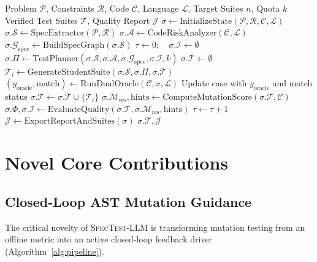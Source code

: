 \documentclass[conference]{IEEEtran}
\begin{document}
\begin{algorithm}[t]
\caption{Closed-Loop Mutation-Guided Test Generation}
\label{alg:pipeline}
\begin{algorithmic}[1]
\REQUIRE Problem $\mathcal{P}$, Constraints $\mathcal{R}$, Code $\mathcal{C}$, Language $\mathcal{L}$, Target Suites $n$, Quota $k$
\ENSURE Verified Test Suites $\mathcal{T}$, Quality Report $\mathcal{J}$
\STATE $\sigma \leftarrow \text{InitializeState}(\mathcal{P}, \mathcal{R}, \mathcal{C}, \mathcal{L})$
\STATE $\sigma.\mathcal{S} \leftarrow \text{SpecExtractor}(\mathcal{P}, \mathcal{R})$
\STATE $\sigma.\mathcal{A} \leftarrow \text{CodeRiskAnalyzer}(\mathcal{C}, \mathcal{L})$
\STATE $\sigma.\mathcal{G}_{\text{spec}} \leftarrow \text{BuildSpecGraph}(\sigma.\mathcal{S})$
\STATE $\tau \leftarrow 0; \quad \sigma.\mathcal{I} \leftarrow \emptyset$
\REPEAT
    \STATE $\sigma.\Pi \leftarrow \text{TestPlanner}(\sigma.\mathcal{S}, \sigma.\mathcal{A}, \sigma.\mathcal{G}_{\text{spec}}, \sigma.\mathcal{I}, k)$
    \STATE $\sigma.\mathcal{T} \leftarrow \emptyset$
        \STATE $\mathcal{T}_i \leftarrow \text{GenerateStudentSuite}(\sigma.\mathcal{S}, \sigma.\Pi, \sigma.\mathcal{T})$
            \STATE $(y_{\text{oracle}}, \text{match}) \leftarrow \text{RunDualOracle}(\mathcal{C}, x, \mathcal{L})$
            \STATE Update case with $y_{\text{oracle}}$ and match status
        \ENDFOR
        \STATE $\sigma.\mathcal{T} \leftarrow \sigma.\mathcal{T} \cup \{\mathcal{T}_i\}$
    \ENDFOR
    \STATE $\sigma.\mathcal{M}_{\text{res}}, \text{hints} \leftarrow \text{ComputeMutationScore}(\sigma.\mathcal{T}, \mathcal{C})$
    \STATE $\sigma.\Phi, \sigma.\mathcal{I} \leftarrow \text{EvaluateQuality}(\sigma.\mathcal{T}, \sigma.\mathcal{M}_{\text{res}}, \text{hints})$
    \STATE $\tau \leftarrow \tau + 1$
\STATE $\mathcal{J} \leftarrow \text{ExportReportAndSuites}(\sigma)$
\RETURN $\sigma.\mathcal{T}, \mathcal{J}$
\end{algorithmic}
\end{algorithm}

\section{Novel Core Contributions}
\label{sec:novelty}

\subsection{Closed-Loop AST Mutation Guidance}
The critical novelty of \textsc{SpecTest-LLM} is transforming mutation testing from an offline metric into an active closed-loop feedback driver (Algorithm~\ref{alg:pipeline}). 
\end{document}
